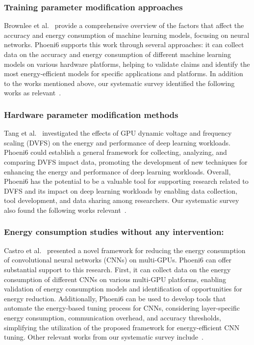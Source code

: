 \subsubsection{Training parameter modification approaches}
Brownlee et al.~\cite{trade-off-accuracy-energy2021} provide a comprehensive overview of the factors that affect the accuracy and energy consumption of machine learning models, focusing on neural networks. Phoeni6 supports this work through several approaches: it can collect data on the accuracy and energy consumption of different machine learning models on various hardware platforms, helping to validate claims and identify the most energy-efficient models for specific applications and platforms. 
%
In addition to the works mentioned above, our systematic survey identified the following works as relevant~\cite{patterson2021carbon,mehlin2023towards,metz2020tasks}.
    
\subsubsection{Hardware parameter modification methods}
Tang et al.~\cite{Impact-GPU-DVFS:2019} investigated the effects of GPU dynamic voltage and frequency scaling (DVFS) on the energy and performance of deep learning workloads.
Phoeni6 could establish a general framework for collecting, analyzing, and comparing DVFS impact data, promoting the development of new techniques for enhancing the energy and performance of deep learning workloads. Overall, Phoeni6 has the potential to be a valuable tool for supporting research related to DVFS and its impact on deep learning workloads by enabling data collection, tool development, and data sharing among researchers.
%
Our systematic survey also found the following works relevant~\cite{tang2019impact,mei2017survey,mei2013measurement}.

\subsubsection{Energy consumption studies without any intervention:} 
Castro et al.~\cite{Energy-based-tuning:2018} presented a novel framework for reducing the energy consumption of convolutional neural networks (CNNs) on multi-GPUs.
Phoeni6 can offer substantial support to this research. First, it can collect data on the energy consumption of different CNNs on various multi-GPU platforms, enabling validation of energy consumption models and identification of opportunities for energy reduction. Additionally, Phoeni6 can be used to develop tools that automate the energy-based tuning process for CNNs, considering layer-specific energy consumption, communication overhead, and accuracy thresholds, simplifying the utilization of the proposed framework for energy-efficient CNN tuning.
%
Other relevant works from our systematic survey include~\cite{yao2021evaluating,yao2021evaluating,sun2021evaluating,zhao2023sustainable}.

